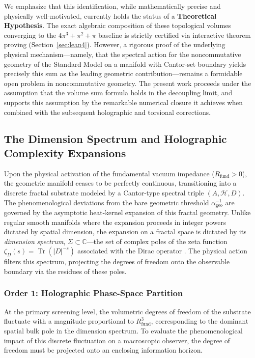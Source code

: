 \documentclass[12pt,a4paper]{article}
\begin{document}
We emphasize that this identification, while mathematically precise and physically well-motivated, currently holds the status of a \textbf{Theoretical Hypothesis}. The exact algebraic composition of these topological volumes converging to the $4\pi^3 + \pi^2 + \pi$ baseline is strictly certified via interactive theorem proving (Section~\ref{sec:lean4}). However, a rigorous proof of the underlying physical mechanism—namely, that the spectral action for the noncommutative geometry of the Standard Model on a manifold with Cantor-set boundary yields precisely this sum as the leading geometric contribution—remains a formidable open problem in noncommutative geometry. The present work proceeds under the assumption that the volume sum formula holds in the decoupling limit, and supports this assumption by the remarkable numerical closure it achieves when combined with the subsequent holographic and torsional corrections.

\subsection{The Dimension Spectrum and Holographic Complexity Expansions}

Upon the physical activation of the fundamental vacuum impedance ($R_{\text{fund}} > 0$), the geometric manifold ceases to be perfectly continuous, transitioning into a discrete fractal substrate modeled by a Cantor-type spectral triple $(A, \mathcal{H}, D)$. The phenomenological deviations from the bare geometric threshold $\alpha^{-1}_{\text{geo}}$ are governed by the asymptotic heat-kernel expansion of this fractal geometry. Unlike regular smooth manifolds where the expansion proceeds in integer powers dictated by spatial dimension, the expansion on a fractal space is dictated by its \textit{dimension spectrum}, $\Sigma \subset \mathbb{C}$—the set of complex poles of the zeta function $\zeta_D(s) = \operatorname{Tr}(|D|^{-s})$ associated with the Dirac operator \cite{lapidus2006, marcolli2011}. The physical action filters this spectrum, projecting the degrees of freedom onto the observable boundary via the residues of these poles.

\subsubsection{Order 1: Holographic Phase-Space Partition}
At the primary screening level, the volumetric degrees of freedom of the substrate fluctuate with a magnitude proportional to $R_{\text{fund}}^3$, corresponding to the dominant spatial bulk pole in the dimension spectrum. To evaluate the phenomenological impact of this discrete fluctuation on a macroscopic observer, the degree of freedom must be projected onto an enclosing information horizon.
\end{document}
